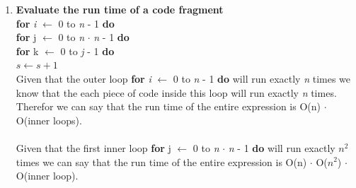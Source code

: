 \documentclass{article}
\newcommand\tab[1][.5cm]{\hspace*{#1}}
\begin{document}
\begin{enumerate}
\begin{lstlisting}
public class Q3 {
    public static void main(String[] args) {
        /*
            For this question we will assume that the input looks like
            n - Followed by n lines of:
            Item Price
            m - Followed by M lines of:
            Quantity Item
            Assuming that the data is coming from stdin
         */
        Scanner input = new Scanner(System.in);
        Map<String, Double> prices = new HashMap<>();
        double total = 0;
        int n = Integer.parseInt(input.nextLine());
        while(n-->0) {
            String item = input.next();
            double price =  Double.parseDouble(input.nextLine());
            prices.put(item, price);
        }
        int m = Integer.parseInt(input.nextLine());
        while(m-->0) {
            int quantity = Integer.parseInt(input.next());
            String item = input.nextLine().trim();
            if(prices.containsKey(item)) {
                total += prices.get(item) * quantity;
            }else {
                throw new RuntimeException("Undefined grocery item");
            }
        }
        System.out.println(String.format("The total of the shopping list is: $%.2f",  total));
        System.exit(0);
    }
}
 \end{lstlisting}
 The output of running the program:
 \begin{lstlisting}[language=bash]
  $ java Q3 << cat EOF
  5
  Book     8.95
  Pen      0.99
  Eraser   0.50
  Case     3.75
  Backpack 29.99
  4
  1 Backpack
  6 Pen
  2 Eraser
  1 Book
  EOF
  The total of the shopping list is: $45.88
  $
\end{lstlisting}
  
  \item \textbf{Evaluate the run time of a code fragment}
  \\
  \textbf{for} \textit{i} $\leftarrow$ 0 to \textit{n} - 1 \textbf{do} \\
  \tab \textbf{for} j $\leftarrow$ 0 to \textit{n} $\cdot$ \textit{n} - 1 \textbf{do} \\
  \tab \tab  \textbf{for} k $\leftarrow$ 0 to \textit{j} - 1 \textbf{do} \\
  \tab \tab \tab $s \leftarrow s + 1$
  \\
  Given that the outer loop 
  	{\textbf{for} \textit{i} $\leftarrow$ 0 to \textit{n} - 1 \textbf{do}
  }
  will  run exactly \textit{n} times we know that the each piece of code inside this loop will run exactly \textit{n} times. Therefor we can say that the run time of the entire expression is O(n) $\cdot$ O(inner loops).
  \\
  \\
  Given that the first inner loop 
  	{\textbf{for} j $\leftarrow$ 0 to \textit{n} $\cdot$ \textit{n} - 1 \textbf{do}
  }
  will run exactly $n^2$ times we can say that the run time of the entire expression is O(n) $\cdot$ O($n^2$) $\cdot$ O(inner loop).
  

\end{enumerate}
\end{document}
